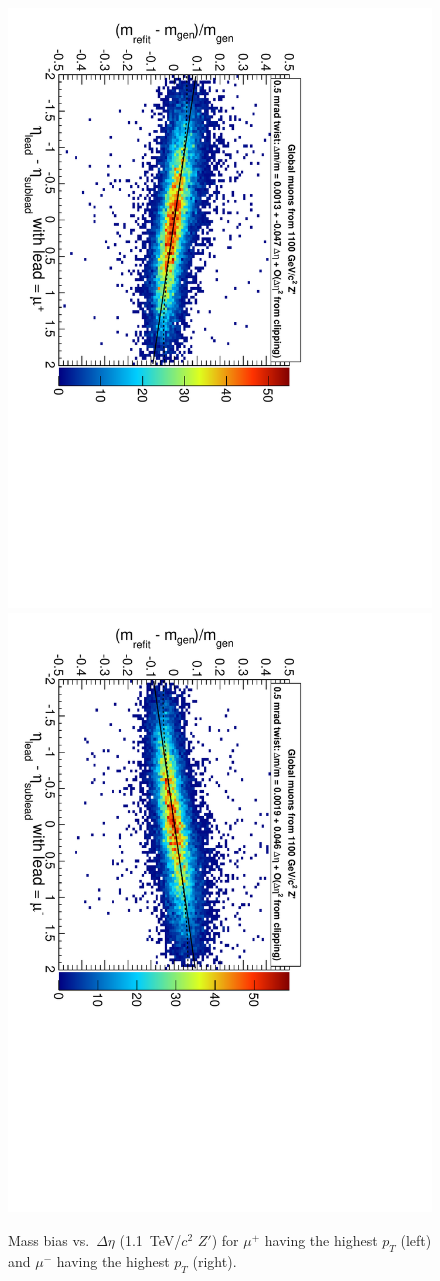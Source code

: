 \documentclass[12pt]{article}
\begin{document}
\begin{figure}
\includegraphics[height=0.5\linewidth, angle=90]{massbias_twist0_5mrad_1100_GlobalMuons2_plus.pdf}
\includegraphics[height=0.5\linewidth, angle=90]{massbias_twist0_5mrad_1100_GlobalMuons2_minus.pdf}

\caption{Mass bias vs.\ $\Delta \eta$ (1.1~TeV/$c^2$ $Z'$) for $\mu^+$
  having the highest $p_T$ (left) and $\mu^-$ having the highest $p_T$
  (right). \label{fig:massbias_twist0_5mrad_1100_GlobalMuons2_plus}}
\end{figure}
\end{document}
